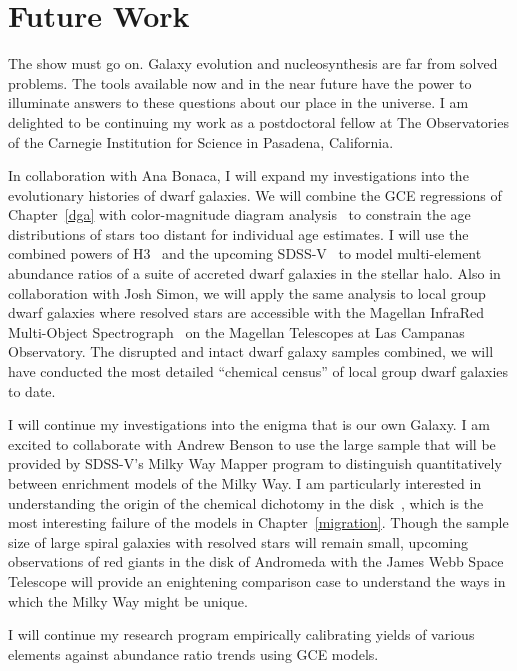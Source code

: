 \documentclass[main.tex]{subfiles}
\begin{document}
\section{Future Work}
\label{conclusions:sec:future-work}

The show must go on.
Galaxy evolution and nucleosynthesis are far from solved problems.
The tools available now and in the near future have the power to illuminate
answers to these questions about our place in the universe.
I am delighted to be continuing my work as a postdoctoral fellow at The
Observatories of the Carnegie Institution for Science in Pasadena, California.
\par
In collaboration with Ana Bonaca, I will expand my investigations into the
evolutionary histories of dwarf galaxies.
We will combine the GCE regressions of Chapter~\ref{dga} with color-magnitude
diagram analysis~\citep[e.g.,][]{Dolphin2002, Weisz2014a} to constrain the age
distributions of stars too distant for individual age estimates.
I will use the combined powers of H3~\citep{Conroy2019} and the upcoming
SDSS-V~\citep{Kollmeier2017} to model multi-element abundance ratios of a
suite of accreted dwarf galaxies in the stellar halo.
Also in collaboration with Josh Simon, we will apply the same analysis to
local group dwarf galaxies where resolved stars are accessible with the
Magellan InfraRed Multi-Object Spectrograph~\citep[MIRMOS;][]{Konidaris2022} on
the Magellan Telescopes at Las Campanas Observatory.
The disrupted and intact dwarf galaxy samples combined, we will have conducted
the most detailed ``chemical census'' of local group dwarf galaxies to date.
\par
I will continue my investigations into the enigma that is our own Galaxy.
I am excited to collaborate with Andrew Benson to use the large sample that
will be provided by SDSS-V's Milky Way Mapper program to distinguish
quantitatively between enrichment models of the Milky Way.
I am particularly interested in understanding the origin of the chemical
dichotomy in the disk~\citep[e.g.,][]{Hayden2015}, which is the most
interesting failure of the models in Chapter~\ref{migration}.
Though the sample size of large spiral galaxies with resolved stars will
remain small, upcoming observations of red giants in the disk of Andromeda with
the James Webb Space Telescope will provide an enightening comparison case to
understand the ways in which the Milky Way might be unique.
\par
I will continue my research program empirically calibrating yields of various
elements against abundance ratio trends using GCE models.
\end{document}
